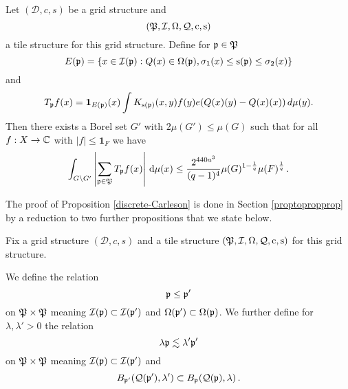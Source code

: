 \begin{proposition}
\label{discrete-Carleson}
Let $(\mathcal{D}, c, s)$ be a grid structure and \begin{equation*}
    ({\mathfrak P},{\mathcal{I}},{\Omega},{\mathcal{Q}},{\mathrm{c}},{\mathrm{s}})
\end{equation*}
a tile structure  for this grid structure.
Define for ${\mathfrak p}\in {\mathfrak P}$
\begin{equation}\label{defineep}
    E({\mathfrak p})=\{x\in {\mathcal{I}}({\mathfrak p}): {Q}(x)\in {\Omega}({\mathfrak p}) , {\sigma_1}(x)\le {\mathrm{s}}({\mathfrak p})\le {\sigma_2}(x)\}
\end{equation}
and
\begin{equation}\label{definetp}
    T_{{\mathfrak p}} f(x)= \mathbf{1}_{E({\mathfrak p})}(x) \int   K_{{\mathrm{s}}({\mathfrak p})}(x,y) f(y) e({Q}(x)(y)-{Q}(x)(x))\, d\mu(y).
\end{equation}
Then there exists a Borel set $G'$ with $2\mu(G') \leq \mu(G)$ such that for all $f:X\to {\mathbb{C}}$ with $|f|\le \mathbf{1}_F$
we have
\begin{equation}
    \label{disclesssim}
   \int_{G \setminus G'} \left| \sum_{{\mathfrak p} \in {\mathfrak P}} T_{{\mathfrak p}} f (x) \right| \, \mathrm{d}\mu(x)  \le \frac{2^{440a^3}}{(q-1)^4} \mu(G)^{1-\frac{1}{q}} \mu(F)^{\frac{1}{q}}\,.
\end{equation}
\end{proposition}









The proof of Proposition \ref{discrete-Carleson} is done in Section \ref{proptopropprop}
by a reduction to two further propositions that we state below.


Fix a grid structure  $(\mathcal{D}, c, s)$  and a tile structure $({\mathfrak P},{\mathcal{I}},{\Omega},{\mathcal{Q}},{\mathrm{c}},{\mathrm{s}})$
for this grid structure.

We define the relation
\begin{equation}\label{straightorder}
    {\mathfrak p}\le {\mathfrak p}'
\end{equation}
 on ${\mathfrak P}\times {\mathfrak P}$ meaning
${\mathcal{I}}({\mathfrak p})\subset {\mathcal{I}}({\mathfrak p}')$ and
$\Omega({\mathfrak p}')\subset \Omega({\mathfrak p})$.
We further define for $\lambda,\lambda' >0$
the relation
\begin{equation}\label{wiggleorder}
    \lambda {\mathfrak p} \lesssim \lambda' {\mathfrak p}'
\end{equation}
on ${\mathfrak P}\times {\mathfrak P}$ meaning
${\mathcal{I}}({\mathfrak p})\subset {\mathcal{I}}({\mathfrak p}')$ and
\begin{equation}
    B_{{\mathfrak p}'}({\mathcal{Q}}({\mathfrak p}'),\lambda' )
    \subset B_{{\mathfrak p}}({\mathcal{Q}}({\mathfrak p}),\lambda )\, .
\end{equation}




